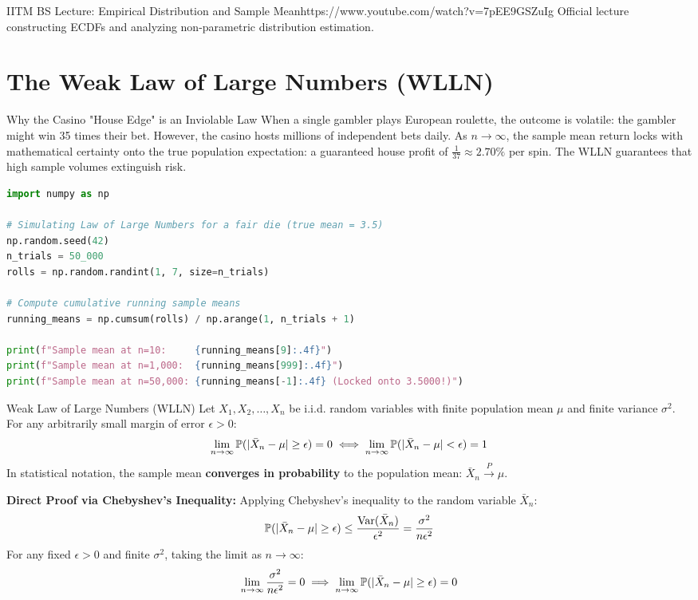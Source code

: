 \begin{videocard}{IITM BS Lecture: Empirical Distribution and Sample Mean}{https://www.youtube.com/watch?v=7pEE9GSZuIg}
Official lecture constructing ECDFs and analyzing non-parametric distribution estimation.
\end{videocard}

\section{The Weak Law of Large Numbers (WLLN)}

\begin{intuitionbox}{Why the Casino "House Edge" is an Inviolable Law}
When a single gambler plays European roulette, the outcome is volatile: the gambler might win 35 times their bet. However, the casino hosts millions of independent bets daily. As $n \to \infty$, the sample mean return locks with mathematical certainty onto the true population expectation: a guaranteed house profit of $\frac{1}{37} \approx 2.70\%$ per spin. The WLLN guarantees that high sample volumes extinguish risk.
\end{intuitionbox}

\begin{lstlisting}[language=Python, caption=Data Science: Simulating the Law of Large Numbers in Python]
import numpy as np

# Simulating Law of Large Numbers for a fair die (true mean = 3.5)
np.random.seed(42)
n_trials = 50_000
rolls = np.random.randint(1, 7, size=n_trials)

# Compute cumulative running sample means
running_means = np.cumsum(rolls) / np.arange(1, n_trials + 1)

print(f"Sample mean at n=10:     {running_means[9]:.4f}")
print(f"Sample mean at n=1,000:  {running_means[999]:.4f}")
print(f"Sample mean at n=50,000: {running_means[-1]:.4f} (Locked onto 3.5000!)")
\end{lstlisting}

\begin{theorembox}{Weak Law of Large Numbers (WLLN)}
Let $X_1, X_2, \dots, X_n$ be i.i.d. random variables with finite population mean $\mu$ and finite variance $\sigma^2$. For any arbitrarily small margin of error $\epsilon > 0$:
$$\lim_{n \to \infty} \P(|\bar{X}_n - \mu| \ge \epsilon) = 0 \iff \lim_{n \to \infty} \P(|\bar{X}_n - \mu| < \epsilon) = 1$$
In statistical notation, the sample mean \textbf{converges in probability} to the population mean: $\bar{X}_n \xrightarrow{P} \mu$.

\textbf{Direct Proof via Chebyshev's Inequality:}
Applying Chebyshev's inequality to the random variable $\bar{X}_n$:
$$\P(|\bar{X}_n - \mu| \ge \epsilon) \le \frac{\Var(\bar{X}_n)}{\epsilon^2} = \frac{\sigma^2}{n \epsilon^2}$$
For any fixed $\epsilon > 0$ and finite $\sigma^2$, taking the limit as $n \to \infty$:
$$\lim_{n \to \infty} \frac{\sigma^2}{n \epsilon^2} = 0 \implies \lim_{n \to \infty} \P(|\bar{X}_n - \mu| \ge \epsilon) = 0$$
\end{theorembox}

